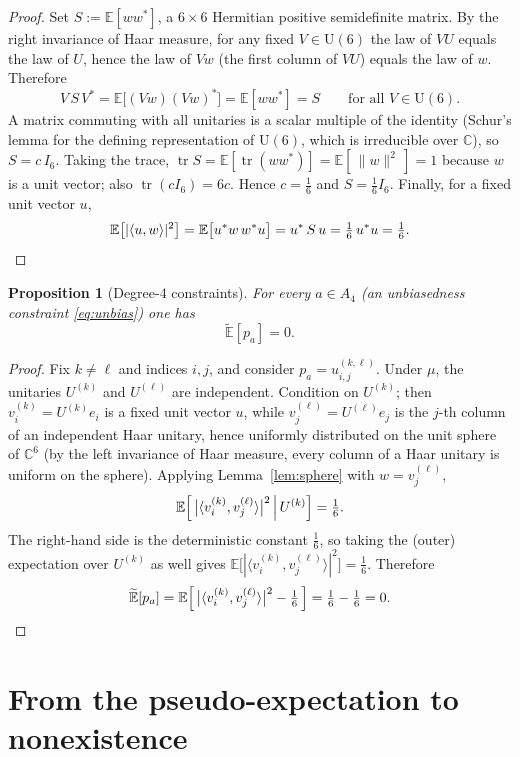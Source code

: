 \documentclass{amsart}
\newtheorem{proposition}{Proposition}
\theoremstyle{definition}
\begin{document}
\begin{proof}
Set $S:=\mathbb{E}[ww^{*}]$, a $6\times6$ Hermitian positive semidefinite matrix. By the right
invariance of Haar measure, for any fixed $V\in\mathrm{U}(6)$ the law of $VU$ equals the law of
$U$, hence the law of $Vw$ (the first column of $VU$) equals the law of $w$. Therefore
\[
V\,S\,V^{*}=\mathbb{E}\bigl[(Vw)(Vw)^{*}\bigr]=\mathbb{E}[ww^{*}]=S
\qquad\text{for all }V\in\mathrm{U}(6).
\]
A matrix commuting with all unitaries is a scalar multiple of the identity (Schur's lemma for
the defining representation of $\mathrm{U}(6)$, which is irreducible over $\mathbb{C}$), so
$S=c\,I_6$. Taking the trace, $\operatorname{tr}S=\mathbb{E}[\operatorname{tr}(ww^{*})]
=\mathbb{E}[\,\|w\|^2\,]=1$ because $w$ is a unit vector; also $\operatorname{tr}(cI_6)=6c$.
Hence $c=\tfrac16$ and $S=\tfrac16 I_6$. Finally, for a fixed unit vector $u$,
\[
\mathbb{E}\bigl[|\langle u,w\rangle|^2\bigr]
=\mathbb{E}\bigl[u^{*}w\,w^{*}u\bigr]
=u^{*}\,S\,u=\tfrac16\,u^{*}u=\tfrac16. \qedhere
\]
\end{proof}

\begin{proposition}[Degree-$4$ constraints]\label{prop:deg4}
For every $a\in A_4$ (an unbiasedness constraint \eqref{eq:unbias}) one has
\[
\widetilde{\mathbb{E}}[p_a]=0 .
\]
\end{proposition}

\begin{proof}
Fix $k\ne\ell$ and indices $i,j$, and consider $p_a=u^{(k,\ell)}_{i,j}$. Under $\mu$, the
unitaries $U^{(k)}$ and $U^{(\ell)}$ are independent. Condition on $U^{(k)}$; then
$v^{(k)}_i=U^{(k)}e_i$ is a fixed unit vector $u$, while $v^{(\ell)}_j=U^{(\ell)}e_j$ is the
$j$-th column of an independent Haar unitary, hence uniformly distributed on the unit sphere of
$\mathbb{C}^6$ (by the left invariance of Haar measure, every column of a Haar unitary is
uniform on the sphere). Applying Lemma~\ref{lem:sphere} with $w=v^{(\ell)}_j$,
\[
\mathbb{E}\Bigl[\,\bigl|\langle v^{(k)}_i,v^{(\ell)}_j\rangle\bigr|^2 \,\Big|\, U^{(k)}\Bigr]
=\tfrac16 .
\]
The right-hand side is the deterministic constant $\tfrac16$, so taking the (outer)
expectation over $U^{(k)}$ as well gives
$\mathbb{E}\bigl[|\langle v^{(k)}_i,v^{(\ell)}_j\rangle|^2\bigr]=\tfrac16$. Therefore
\[
\widetilde{\mathbb{E}}[p_a]
=\mathbb{E}\Bigl[\,\bigl|\langle v^{(k)}_i,v^{(\ell)}_j\rangle\bigr|^2-\tfrac16\,\Bigr]
=\tfrac16-\tfrac16=0 . \qedhere
\]
\end{proof}

\section{From the pseudo-expectation to nonexistence}\label{sec:duality}
\end{document}
